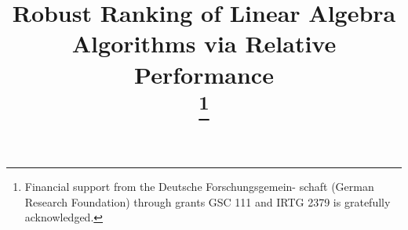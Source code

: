 \documentclass[conference]{IEEEtran}
\begin{document}
\title{Robust Ranking of Linear Algebra Algorithms via Relative Performance\\
\thanks{Financial support from the Deutsche Forschungsgemein- schaft (German Research Foundation) through grants GSC 111 and IRTG 2379 is gratefully acknowledged.}
}

\author{
\and
{}
}

\maketitle
\end{document}
